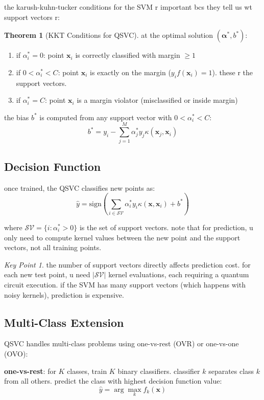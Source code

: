 \documentclass[11pt,a4paper]{article}
\theoremstyle{definition}
\newtheorem{theorem}{Theorem}[section]
\theoremstyle{remark}
\newtheorem*{keypoint}{Key Point}
\begin{document}
the karush-kuhn-tucker conditions for the SVM r important bcs they tell us wt support vectors r:

\begin{theorem}[KKT Conditions for QSVC]
at the optimal solution $(\boldsymbol{\alpha}^*, b^*)$:
\begin{enumerate}[leftmargin=*]
    \item if $\alpha_i^* = 0$: point $\mathbf{x}_i$ is correctly classified with margin $\geq 1$
    \item if $0 < \alpha_i^* < C$: point $\mathbf{x}_i$ is exactly on the margin ($y_i f(\mathbf{x}_i) = 1$). these r the support vectors.
    \item if $\alpha_i^* = C$: point $\mathbf{x}_i$ is a margin violator (misclassified or inside margin)
\end{enumerate}
the bias $b^*$ is computed from any support vector with $0 < \alpha_i^* < C$:
\[
b^* = y_i - \sum_{j=1}^M \alpha_j^* y_j \kappa(\mathbf{x}_j, \mathbf{x}_i)
\]
\end{theorem}

\subsection{Decision Function}

once trained, the QSVC classifies new points as:
\[
\hat{y} = \text{sign}\!\left(\sum_{i \in \mathcal{SV}} \alpha_i^* y_i \kappa(\mathbf{x}, \mathbf{x}_i) + b^*\right)
\]

where $\mathcal{SV} = \{i : \alpha_i^* > 0\}$ is the set of support vectors. note that for prediction, u only need to compute kernel values between the new point and the support vectors, not all training points.

\begin{keypoint}
the number of support vectors directly affects prediction cost. for each new test point, u need $|\mathcal{SV}|$ kernel evaluations, each requiring a quantum circuit execution. if the SVM has many support vectors (which happens with noisy kernels), prediction is expensive.
\end{keypoint}

\subsection{Multi-Class Extension}

QSVC handles multi-class problems using one-vs-rest (OVR) or one-vs-one (OVO):

\textbf{one-vs-rest}: for $K$ classes, train $K$ binary classifiers. classifier $k$ separates class $k$ from all others. predict the class with highest decision function value:
\[
\hat{y} = \arg\max_k f_k(\mathbf{x})
\]
\end{document}
